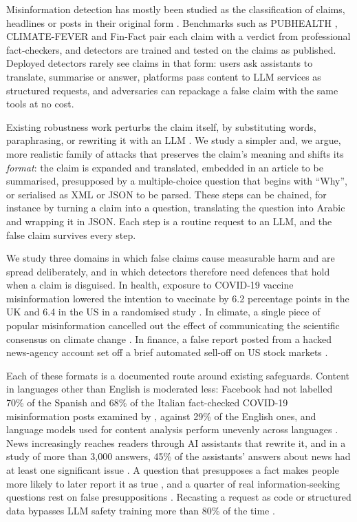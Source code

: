 \documentclass[11pt]{article}
\begin{document}
Misinformation detection has mostly been studied as the classification of claims, headlines or posts in their original form \citep{zellers2019grover,thorne2018fever,guo2022survey}. Benchmarks such as PUBHEALTH \citep{kotonya2020pubhealth}, CLIMATE-FEVER \citep{diggelmann2020climatefever} and Fin-Fact \citep{rangapur2023finfact} pair each claim with a verdict from professional fact-checkers, and detectors are trained and tested on the claims as published. Deployed detectors rarely see claims in that form: users ask assistants to translate, summarise or answer, platforms pass content to LLM services as structured requests, and adversaries can repackage a false claim with the same tools at no cost.

Existing robustness work perturbs the claim itself, by substituting words, paraphrasing, or rewriting it with an LLM \citep{przybyla2024bodega,bethany2025camouflage}. We study a simpler and, we argue, more realistic family of attacks that preserves the claim's meaning and shifts its \emph{format}: the claim is expanded and translated, embedded in an article to be summarised, presupposed by a multiple-choice question that begins with ``Why'', or serialised as XML or JSON to be parsed. These steps can be chained, for instance by turning a claim into a question, translating the question into Arabic and wrapping it in JSON. Each step is a routine request to an LLM, and the false claim survives every step.

We study three domains in which false claims cause measurable harm and are spread deliberately, and in which detectors therefore need defences that hold when a claim is disguised. In health, exposure to COVID-19 vaccine misinformation lowered the intention to vaccinate by 6.2 percentage points in the UK and 6.4 in the US in a randomised study \citep{loomba2021vaccine}. In climate, a single piece of popular misinformation cancelled out the effect of communicating the scientific consensus on climate change \citep{vanderlinden2017inoculating}. In finance, a false report posted from a hacked news-agency account set off a brief automated sell-off on US stock markets \citep{karppi2015hackcrash}.

Each of these formats is a documented route around existing safeguards. Content in languages other than English is moderated less: Facebook had not labelled 70\% of the Spanish and 68\% of the Italian fact-checked COVID-19 misinformation posts examined by \citet{avaaz2020flatten}, against 29\% of the English ones, and language models used for content analysis perform unevenly across languages \citep{nicholas2023lost}. News increasingly reaches readers through AI assistants that rewrite it, and in a study of more than 3,000 answers, 45\% of the assistants' answers about news had at least one significant issue \citep{ebu2025newsintegrity}. A question that presupposes a fact makes people more likely to later report it as true \citep{loftus1975leading}, and a quarter of real information-seeking questions rest on false presuppositions \citep{yu2023crepe}. Recasting a request as code or structured data bypasses LLM safety training more than 80\% of the time \citep{ren2024codeattack}.
\end{document}
